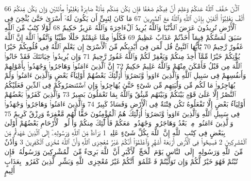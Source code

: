 {\tiny\colorbox{cl_aya}{66}} ٱلْـَٰٔنَ خَفَّفَ ٱللَّهُ عَنكُمْ وَعَلِمَ أَنَّ فِيكُمْ ضَعْفًا فَإِن يَكُن مِّنكُم مِّا۟ئَةٌ صَابِرَةٌ يَغْلِبُوا۟ مِا۟ئَتَيْنِ وَإِن يَكُن مِّنكُمْ أَلْفٌ يَغْلِبُوٓا۟ أَلْفَيْنِ بِإِذْنِ ٱللَّهِ وَٱللَّهُ مَعَ ٱلصَّٰبِرِينَ
{\tiny\colorbox{cl_aya}{67}} مَا كَانَ لِنَبِىٍّ أَن يَكُونَ لَهُۥٓ أَسْرَىٰ حَتَّىٰ يُثْخِنَ فِى ٱلْأَرْضِ تُرِيدُونَ عَرَضَ ٱلدُّنْيَا وَٱللَّهُ يُرِيدُ ٱلْءَاخِرَةَ وَٱللَّهُ عَزِيزٌ حَكِيمٌ
{\tiny\colorbox{cl_aya}{68}} لَّوْلَا كِتَٰبٌ مِّنَ ٱللَّهِ سَبَقَ لَمَسَّكُمْ فِيمَآ أَخَذْتُمْ عَذَابٌ عَظِيمٌ
{\tiny\colorbox{cl_aya}{69}} فَكُلُوا۟ مِمَّا غَنِمْتُمْ حَلَٰلًا طَيِّبًا وَٱتَّقُوا۟ ٱللَّهَ إِنَّ ٱللَّهَ غَفُورٌ رَّحِيمٌ
{\tiny\colorbox{cl_aya}{70}} يَٰٓأَيُّهَا ٱلنَّبِىُّ قُل لِّمَن فِىٓ أَيْدِيكُم مِّنَ ٱلْأَسْرَىٰٓ إِن يَعْلَمِ ٱللَّهُ فِى قُلُوبِكُمْ خَيْرًا يُؤْتِكُمْ خَيْرًا مِّمَّآ أُخِذَ مِنكُمْ وَيَغْفِرْ لَكُمْ وَٱللَّهُ غَفُورٌ رَّحِيمٌ
{\tiny\colorbox{cl_aya}{71}} وَإِن يُرِيدُوا۟ خِيَانَتَكَ فَقَدْ خَانُوا۟ ٱللَّهَ مِن قَبْلُ فَأَمْكَنَ مِنْهُمْ وَٱللَّهُ عَلِيمٌ حَكِيمٌ
{\tiny\colorbox{cl_aya}{72}} إِنَّ ٱلَّذِينَ ءَامَنُوا۟ وَهَاجَرُوا۟ وَجَٰهَدُوا۟ بِأَمْوَٰلِهِمْ وَأَنفُسِهِمْ فِى سَبِيلِ ٱللَّهِ وَٱلَّذِينَ ءَاوَوا۟ وَّنَصَرُوٓا۟ أُو۟لَٰٓئِكَ بَعْضُهُمْ أَوْلِيَآءُ بَعْضٍ وَٱلَّذِينَ ءَامَنُوا۟ وَلَمْ يُهَاجِرُوا۟ مَا لَكُم مِّن وَلَٰيَتِهِم مِّن شَىْءٍ حَتَّىٰ يُهَاجِرُوا۟ وَإِنِ ٱسْتَنصَرُوكُمْ فِى ٱلدِّينِ فَعَلَيْكُمُ ٱلنَّصْرُ إِلَّا عَلَىٰ قَوْمٍۭ بَيْنَكُمْ وَبَيْنَهُم مِّيثَٰقٌ وَٱللَّهُ بِمَا تَعْمَلُونَ بَصِيرٌ
{\tiny\colorbox{cl_aya}{73}} وَٱلَّذِينَ كَفَرُوا۟ بَعْضُهُمْ أَوْلِيَآءُ بَعْضٍ إِلَّا تَفْعَلُوهُ تَكُن فِتْنَةٌ فِى ٱلْأَرْضِ وَفَسَادٌ كَبِيرٌ
{\tiny\colorbox{cl_aya}{74}} وَٱلَّذِينَ ءَامَنُوا۟ وَهَاجَرُوا۟ وَجَٰهَدُوا۟ فِى سَبِيلِ ٱللَّهِ وَٱلَّذِينَ ءَاوَوا۟ وَّنَصَرُوٓا۟ أُو۟لَٰٓئِكَ هُمُ ٱلْمُؤْمِنُونَ حَقًّا لَّهُم مَّغْفِرَةٌ وَرِزْقٌ كَرِيمٌ
{\tiny\colorbox{cl_aya}{75}} وَٱلَّذِينَ ءَامَنُوا۟ مِنۢ بَعْدُ وَهَاجَرُوا۟ وَجَٰهَدُوا۟ مَعَكُمْ فَأُو۟لَٰٓئِكَ مِنكُمْ وَأُو۟لُوا۟ ٱلْأَرْحَامِ بَعْضُهُمْ أَوْلَىٰ بِبَعْضٍ فِى كِتَٰبِ ٱللَّهِ إِنَّ ٱللَّهَ بِكُلِّ شَىْءٍ عَلِيمٌۢ
{\tiny\colorbox{cl_aya}{1}} بَرَآءَةٌ مِّنَ ٱللَّهِ وَرَسُولِهِۦٓ إِلَى ٱلَّذِينَ عَٰهَدتُّم مِّنَ ٱلْمُشْرِكِينَ
{\tiny\colorbox{cl_aya}{2}} فَسِيحُوا۟ فِى ٱلْأَرْضِ أَرْبَعَةَ أَشْهُرٍ وَٱعْلَمُوٓا۟ أَنَّكُمْ غَيْرُ مُعْجِزِى ٱللَّهِ وَأَنَّ ٱللَّهَ مُخْزِى ٱلْكَٰفِرِينَ
{\tiny\colorbox{cl_aya}{3}} وَأَذَٰنٌ مِّنَ ٱللَّهِ وَرَسُولِهِۦٓ إِلَى ٱلنَّاسِ يَوْمَ ٱلْحَجِّ ٱلْأَكْبَرِ أَنَّ ٱللَّهَ بَرِىٓءٌ مِّنَ ٱلْمُشْرِكِينَ وَرَسُولُهُۥ فَإِن تُبْتُمْ فَهُوَ خَيْرٌ لَّكُمْ وَإِن تَوَلَّيْتُمْ فَٱعْلَمُوٓا۟ أَنَّكُمْ غَيْرُ مُعْجِزِى ٱللَّهِ وَبَشِّرِ ٱلَّذِينَ كَفَرُوا۟ بِعَذَابٍ أَلِيمٍ
